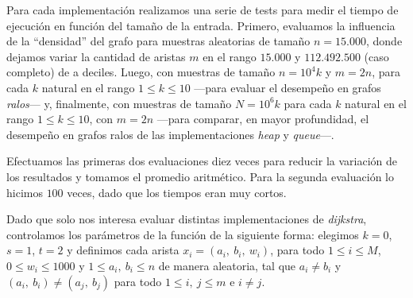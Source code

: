 Para cada implementación realizamos una serie de tests para medir el tiempo de ejecución en función del tamaño de la entrada. Primero, evaluamos la influencia de la ``densidad'' del grafo para muestras aleatorias de tamaño $n = 15.000$, donde dejamos variar la cantidad de aristas $m$ en el rango $15.000$ y $112.492.500$ (caso completo) de a deciles. Luego, con muestras de tamaño $n = 10^4k$ y $m = 2n$, para cada $k$ natural en el rango $1 \leq k \leq 10$ ---para evaluar el desempeño en grafos \textit{ralos}--- y, finalmente, con muestras de tamaño $N = 10^6k$ para cada $k$ natural en el rango $1 \leq k \leq 10$, con $m = 2n$ ---para comparar, en mayor profundidad, el desempeño en grafos ralos de las implementaciones \textit{heap} y \textit{queue}---.


Efectuamos las primeras dos evaluaciones diez veces para reducir la variación de los resultados y tomamos el promedio aritmético. Para la segunda evaluación lo hicimos $100$ veces, dado que los tiempos eran muy cortos.

Dado que solo nos interesa evaluar distintas implementaciones de \textit{dijkstra}, controlamos los parámetros de la función de la siguiente forma: elegimos $k = 0$, $s = 1$, $t = 2$ y definimos cada arista $x_i = (a_i,\ b_i,\ w_i)$, para todo $1 \leq  i \leq M$, $0 \leq w_i \leq 1000$ y $1 \leq a_i,\ b_i \leq n$ de manera aleatoria, tal que $a_i \neq b_i$ y $(a_i,\ b_i) \neq (a_j,\ b_j)$ para todo $1 \leq i,\ j \leq m$ e $i \neq j$.


